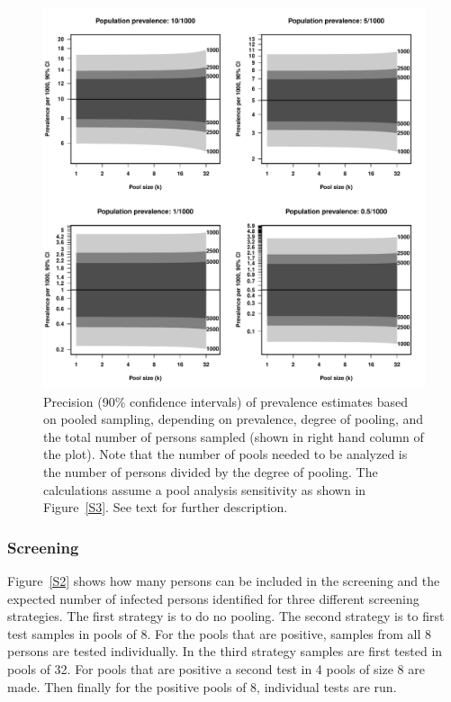 \documentclass[10pt]{article}
\begin{document}
\begin{figure}[!hbt]
\begin{center}
\includegraphics[width=0.95\linewidth]{prevalences_CI.pdf}
\end{center}
\caption{Precision (90\% confidence intervals) of prevalence estimates based on pooled sampling, depending on prevalence, degree of pooling, and the total number of persons sampled (shown in right hand column of the plot). Note that the number of pools needed to be analyzed is the number of persons divided by the degree of pooling. The calculations assume a pool analysis sensitivity as shown in Figure~\ref{S3}. See text for further description.}
\label{S1}
\end{figure}

\subsubsection*{Screening}

Figure~\ref{S2} shows how many persons can be included in the screening and the expected number of infected persons identified for three different screening strategies. The first strategy is to do no pooling. The second strategy is to first test samples in pools of 8. For the pools that are positive, samples from all 8 persons are tested individually. In the third strategy samples are first tested in pools of 32. For pools that are positive a second test in 4 pools of size 8 are made. Then finally for the positive pools of 8, individual tests are run. 
\end{document}
